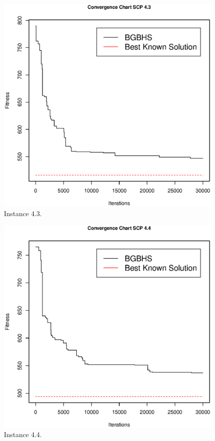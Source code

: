 \begin{figure}[]
\centering
\includegraphics[scale=.5]{Resultados/scp43.eps}
\caption{Instance 4.3.}
\label{fig:Instance.4.3}
\end{figure}

\begin{figure}[]
\centering
\includegraphics[scale=.45]{Resultados/scp44.eps}
\caption{Instance 4.4.}
\label{fig:Instance.4.4}
\end{figure}

